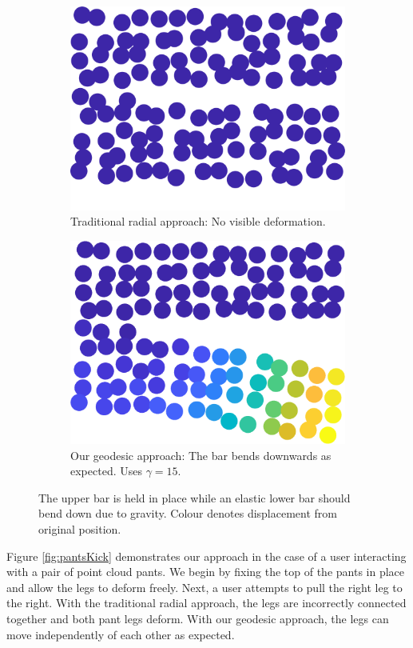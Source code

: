 \documentclass[11pt,a4paper, final, twoside]{article}
\theoremstyle{proposition}
\theoremstyle{definition}
\theoremstyle{remark}
\numberwithin{equation}{section}
\begin{document}
\begin{figure}[h]
\begin{subfigure}[t]{.5\textwidth}
  \centering
  \includegraphics[width=.7\linewidth]{pantsStayColor.png}
  \caption[width=2\textwidth]{Traditional radial approach: No visible deformation.}
\end{subfigure}%
\begin{subfigure}[t]{.5\textwidth}
  \centering
  \includegraphics[width=.7\linewidth]{pantsFall.png}
  \caption{Our geodesic approach: The bar bends downwards as expected. Uses $\gamma = 15$.}
\end{subfigure}
\caption{The upper bar is held in place while an elastic lower bar should bend down due to gravity. Colour denotes displacement from original position.}
\label{fig:barDrop}
\end{figure}

Figure \ref{fig:pantsKick} demonstrates our approach in the case of a user interacting with a pair of point cloud pants. We begin by fixing the top of the pants in place and allow the legs to deform freely. Next, a user attempts to pull the right leg to the right. With the traditional radial approach, the legs are incorrectly connected together and both pant legs deform. With our geodesic approach, the legs can move independently of each other as expected.
\end{document}
